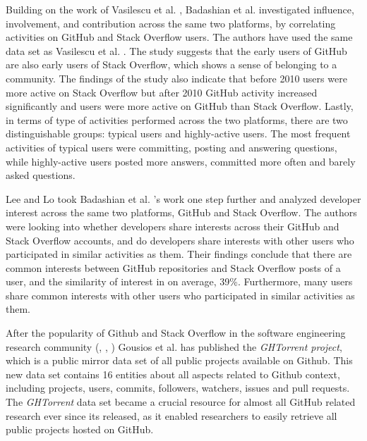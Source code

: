         Building on the work of Vasilescu et al. \cite{vasilescu2013stackoverflow}, Badashian et al. \cite{badashian2014involvement} investigated influence, involvement, and contribution across the same two platforms, by correlating activities on GitHub and Stack Overflow users. The authors have used the same data set as Vasilescu et al. \cite{vasilescu2013stackoverflow}. The study suggests that the early users of GitHub are also early users of Stack Overflow, which shows a sense of belonging to a community. The findings of the study also indicate that before 2010 users were more active on Stack Overflow but after 2010 GitHub activity increased significantly and users were more active on GitHub than Stack Overflow. Lastly, in terms of type of activities performed across the two platforms, there are two distinguishable groups: typical users and highly-active users. The most frequent activities of typical users were committing, posting and answering questions, while highly-active users posted more answers, committed more often and barely asked questions. 
        
        Lee and Lo \cite{lee2017github} took Badashian et al. \cite{badashian2014involvement}'s work one step further and analyzed developer interest across the same two platforms, GitHub and Stack Overflow. The authors were looking into whether developers share interests across their GitHub and Stack Overflow accounts, and do developers share interests with other users who participated in similar activities as them. Their findings conclude that there are common interests between GitHub repositories and Stack Overflow posts of a user, and the similarity of interest in on average, 39\%. Furthermore, many users share common interests with other users who participated in similar activities as them.
        
        After the popularity of Github and Stack Overflow in the software engineering research community (\cite{vasilescu2013stackoverflow}, \cite{badashian2014involvement}, \cite{lee2017github}) Gousios et al. \cite{gousios2013ghtorent} has published the \emph{GHTorrent project}, which is a public mirror data set of all public projects available on Github. This new data set contains 16 entities about all aspects related to Github context, including projects, users, commits, followers, watchers, issues and pull requests. The \emph{GHTorrent} data set became a crucial resource for almost all GitHub related research ever since its released, as it enabled researchers to easily retrieve all public projects hosted on GitHub. 
        
